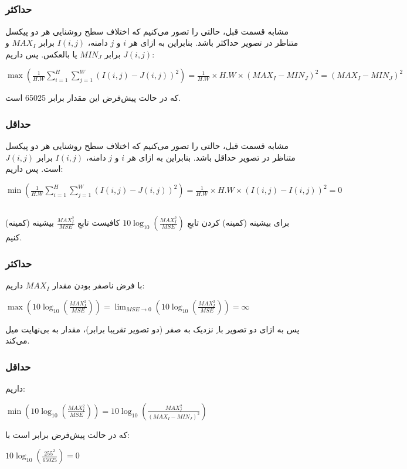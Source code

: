 \documentclass{article}
\begin{document}
\subsection{}
\subsubsection{حداکثر}
مشابه قسمت قبل، حالتی را تصور می‌کنیم که اختلاف سطح روشنایی هر دو پیکسل متناظر در تصویر حداکثر باشد. بنابراین به ازای هر $i$ و $j$ دامنه، $I(i, j)$ برابر $MAX_{I}$ و $J(i, j)$ برابر $MIN_{J}$ یا بالعکس. پس داریم:
\newline
\begin{latin}
$
\max(\frac{1}{H.W}\sum_{i=1}^{H}\sum_{j=1}^{W} (I(i, j) - J(i, j))^{2})=\frac{1}{H.W}\times H.W\times (MAX_{I} - MIN_{J})^{2}=(MAX_{I} - MIN_{J})^{2}
$
\end{latin}
که در حالت پیش‌فرض این مقدار برابر 65025 است.
\subsubsection{حداقل}
مشابه قسمت قبل، حالتی را تصور می‌کنیم که اختلاف سطح روشنایی هر دو پیکسل متناظر در تصویر حداقل باشد. بنابراین به ازای هر $i$ و $j$ دامنه، $I(i, j)$ برابر $J(i, j)$ است. پس داریم:
\newline
\begin{latin}
$
\min(\frac{1}{H.W}\sum_{i=1}^{H}\sum_{j=1}^{W} (I(i, j) - J(i, j))^{2})=\frac{1}{H.W}\times H.W\times (I(i, j) - I(i, j))^{2}=0
$
\end{latin}


\subsection{}
برای بیشینه (کمینه) کردن تابعِ 
$
10\log_{10}(\frac{MAX_{I}^{2}}{MSE})
$
کافیست تابعِ
$
\frac{MAX_{I}^{2}}{MSE}
$
بیشینه (کمینه) کنیم.
\subsubsection{حداکثر}
با فرض ناصفر بودن مقدار $MAX_{I}$ داریم:
\newline
\begin{latin}
$
\max(10\log_{10}(\frac{MAX_{I}^{2}}{MSE}))=\lim_{MSE \to 0 } (10\log_{10}(\frac{MAX_{I}^{2}}{MSE}))=\infty
$
\end{latin}
پس به ازای دو تصویر با ِ نزدیک به صفر (دو تصویر تقریبا برابر)، مقدار  به بی‌نهایت میل می‌کند.
\subsubsection{حداقل}
داریم:
\newline
\begin{latin}
$
\min(10\log_{10}(\frac{MAX_{I}^{2}}{MSE}))=10\log_{10}(\frac{MAX_{I}^{2}}{(MAX_{I}-MIN_{J})^{2}})
$
\end{latin}
که در حالت پیش‌فرض برابر است با:
\newline
\begin{latin}
$
10\log_{10}(\frac{255^{2}}{65025})=0
$
\end{latin}
\end{document}
